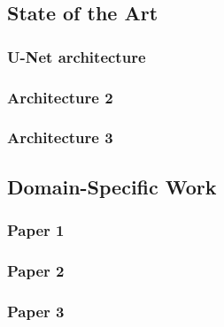 \subsection{State of the Art}
  \subsubsection{U-Net architecture}
  \subsubsection{Architecture 2}
  \subsubsection{Architecture 3}

\subsection{Domain-Specific Work}
  \subsubsection{Paper 1}
  \subsubsection{Paper 2}
  \subsubsection{Paper 3}
